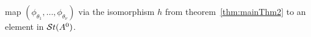  map
$(\phi_{\theta_1},\dots,\phi_{\theta_\nu})$ via the isomorphism $h$ from
theorem~\ref{thm:mainThm2} to an element in $\mathcal{S}{}t(A^0)$.

\begin{comment}
  As an third step, we will apply the morphism $\exp$ from the
  theorem~\ref{thm:mainThm1} and hopefully get the same element in $\St(A^0)$
\end{comment}










